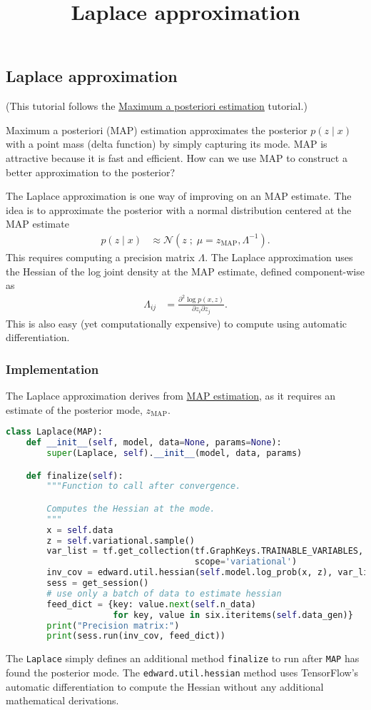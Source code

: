 \title{Laplace approximation}

\subsection{Laplace approximation}

(This tutorial follows the
\href{tut_MAP.html}{Maximum a posteriori estimation} tutorial.)

Maximum a posteriori (MAP) estimation approximates the posterior $p(z \mid x)$
with a point mass (delta function) by simply capturing its mode. MAP is
attractive because it is fast and efficient. How can we use MAP to construct a
better approximation to the posterior?

The Laplace approximation is one way of improving on an MAP estimate. The idea
is to approximate the posterior with a normal distribution centered at the MAP
estimate
\begin{align*}
  p(z \mid x)
  &\approx
  \mathcal{N}(z\;;\; \mu = z_\text{MAP}, \Lambda^{-1}).
\end{align*}
This requires computing a precision matrix $\Lambda$. The Laplace approximation
uses the Hessian of the log joint density at the MAP estimate,
defined component-wise as
\begin{align*}
  \Lambda_{ij}
  &=
  \frac{\partial^2 \log p(x, z)}{\partial z_i \partial z_j}.
\end{align*}
This is also easy (yet computationally expensive) to compute using automatic
differentiation.

\subsubsection{Implementation}

The Laplace approximation derives from \href{tut_MAP.html}{MAP estimation}, as
it requires an estimate of the posterior mode, $z_\text{MAP}$.

\begin{lstlisting}[language=Python]
class Laplace(MAP):
    def __init__(self, model, data=None, params=None):
        super(Laplace, self).__init__(model, data, params)

    def finalize(self):
        """Function to call after convergence.

        Computes the Hessian at the mode.
        """
        x = self.data
        z = self.variational.sample()
        var_list = tf.get_collection(tf.GraphKeys.TRAINABLE_VARIABLES,
                                     scope='variational')
        inv_cov = edward.util.hessian(self.model.log_prob(x, z), var_list)
        sess = get_session()
        # use only a batch of data to estimate hessian
        feed_dict = {key: value.next(self.n_data)
                     for key, value in six.iteritems(self.data_gen)}
        print("Precision matrix:")
        print(sess.run(inv_cov, feed_dict))  
\end{lstlisting}

The \texttt{Laplace} simply defines an additional method \texttt{finalize} to
run after \texttt{MAP} has found the posterior mode. The 
\texttt{edward.util.hessian} method uses TensorFlow's automatic differentiation
to compute the Hessian without any additional mathematical derivations.

